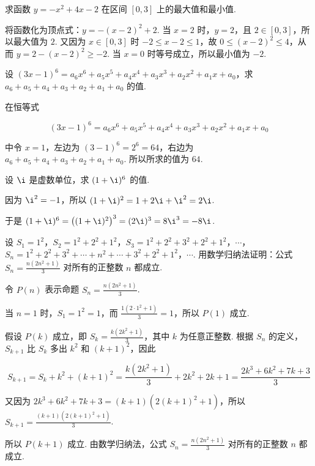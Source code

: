 \documentclass[UTF8,a4paper,oneside,11pt]{ctexbook}
\begin{document}
\begin{problem}

求函数 \(y = -x^{2} + 4x - 2\) 在区间 \([0,3]\) 上的最大值和最小值.
\end{problem}

\begin{solution}
将函数化为顶点式：\(y=-\left(x-2\right)^2+2\). 当 \(x=2\) 时，\(y=2\)，且 \(2\in[0,3]\)，所以最大值为 \(2\). 又因为 \(x\in[0,3]\) 时 \(-2\leqslant x-2\leqslant1\)，故 \(0\leqslant\left(x-2\right)^2\leqslant4\)，从而 \(y=2-\left(x-2\right)^2\geqslant-2\). 当 \(x=0\) 时等号成立，所以最小值为 \(-2\).
\end{solution}

\begin{problem}

设 \((3x-1)^6=a_6x^6+a_5x^5+a_4x^4+a_3x^3+a_2x^2+a_1x+a_0\)，求 \(a_6+a_5+a_4+a_3+a_2+a_1+a_0\) 的值.
\end{problem}

\begin{solution}
在恒等式

\[
(3x-1)^6=a_6x^6+a_5x^5+a_4x^4+a_3x^3+a_2x^2+a_1x+a_0
\]

中令 \(x=1\)，左边为 \((3-1)^6=2^6=64\)，右边为 \(a_6+a_5+a_4+a_3+a_2+a_1+a_0\). 所以所求的值为 \(64\).
\end{solution}

\begin{problem}

设 \(\i\) 是虚数单位，求 \((1+\i)^6\) 的值.
\end{problem}

\begin{solution}
因为 \(\i^2=-1\)，所以 \((1+\i)^2=1+2\i+\i^2=2\i\).

于是 \((1+\i)^6=\left((1+\i)^2\right)^3=(2\i)^3=8\i^3=-8\i\).
\end{solution}

\begin{problem}

设 \(S_1=1^2\)，\(S_2=1^2+2^2+1^2\)，\(S_3=1^2+2^2+3^2+2^2+1^2\)，\(\cdots\)，\(S_n=1^2+2^2+3^2+\cdots+n^2+\cdots+3^2+2^2+1^2\)，\(\cdots\). 用数学归纳法证明：公式 \(S_n=\frac{n(2n^2+1)}{3}\) 对所有的正整数 \(n\) 都成立.
\end{problem}

\begin{solution}
令 \(P(n)\) 表示命题 \(S_n=\frac{n(2n^2+1)}{3}\).

当 \(n=1\) 时，\(S_1=1^2=1\)，而 \(\frac{1(2\cdot1^2+1)}{3}=1\)，所以 \(P(1)\) 成立.

假设 \(P(k)\) 成立，即 \(S_k=\frac{k(2k^2+1)}{3}\)，其中 \(k\) 为任意正整数. 根据 \(S_n\) 的定义，\(S_{k+1}\) 比 \(S_k\) 多出 \(k^2\) 和 \((k+1)^2\)，因此

\[
S_{k+1}=S_k+k^2+\left(k+1\right)^2
=\frac{k\left(2k^2+1\right)}{3}+2k^2+2k+1
=\frac{2k^3+6k^2+7k+3}{3}
\]

又因为 \(2k^3+6k^2+7k+3=\left(k+1\right)\left(2\left(k+1\right)^2+1\right)\)，所以
\(S_{k+1}=\frac{\left(k+1\right)\left(2\left(k+1\right)^2+1\right)}{3}\).

所以 \(P(k+1)\) 成立. 由数学归纳法，公式 \(S_n=\frac{n(2n^2+1)}{3}\) 对所有的正整数 \(n\) 都成立.
\end{solution}
\end{document}

